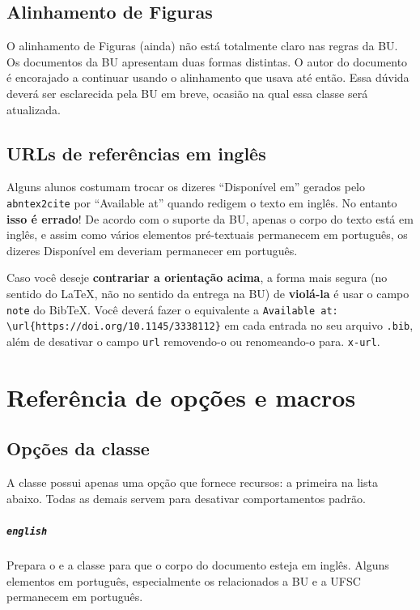\documentclass[embeddedlogo]{../ufsc-thesis-rn46-2019}
\newcommand{\lacmd}[1]{\texttt{\textbackslash{}#1}}
\begin{document}
\section{Alinhamento de Figuras}
O alinhamento de Figuras (ainda) não está totalmente claro nas regras da BU. Os
documentos da BU apresentam duas formas distintas. O autor do documento é
encorajado a continuar usando o alinhamento que usava até então. Essa dúvida
deverá ser esclarecida pela BU em breve, ocasião na qual essa classe será
atualizada.

\section{URLs de referências em inglês}

Alguns alunos costumam trocar os dizeres ``Disponível em'' gerados pelo
\texttt{abntex2cite} por ``Available at'' quando redigem o texto em inglês. No
entanto \textbf{isso é errado}! De acordo com o suporte da BU, apenas o corpo do
texto está em inglês, e assim como vários elementos pré-textuais permanecem em
português, os dizeres Disponível em deveriam permanecer em português.

Caso você deseje \textbf{contrariar a orientação acima}, a forma mais segura (no
sentido do LaTeX, não no sentido da entrega na BU) de \textbf{violá-la} é usar o
campo \texttt{note} do BibTeX. Você deverá fazer o equivalente a
\texttt{Available at: \lacmd{url}\{https://doi.org/10.1145/3338112\}} em cada
entrada no seu arquivo \texttt{.bib}, além de desativar o campo \texttt{url}
removendo-o ou renomeando-o para. \texttt{x-url}.

\chapter{Referência de opções e macros}
\label{ch:ref}

\section{Opções da classe}

A classe possui apenas uma opção que fornece recursos: a primeira na lista
abaixo. Todas as demais servem para desativar comportamentos padrão.

\paragraph*{\texttt{english}} Prepara o \abnTeX{} e a classe para que o corpo
do documento esteja em inglês. Alguns elementos em português, especialmente os
relacionados a BU e a UFSC permanecem em português.
\end{document}
